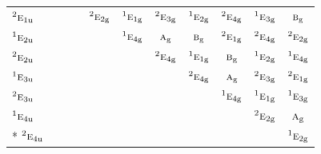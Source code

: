 \documentclass[10pt,a4paper]{article}
\numberwithin{equation}{section}
\newcommand{\irr}[1]{\text{\normalfont\scshape #1}}
\newcommand{\conjpair}[1]{{}^{#1}}
\newcommand{\ptag}[1]{\mathrm{#1}}
\begin{document}
{\begin{longtable}{@{}lcccccccccc@{}}
$\conjpair{2}\irr{e}_{1\ptag{u}}$ &  &  &  & $\conjpair{2}\irr{e}_{2\ptag{g}}$ & $\conjpair{1}\irr{e}_{1\ptag{g}}$ & $\conjpair{2}\irr{e}_{3\ptag{g}}$ & $\conjpair{1}\irr{e}_{2\ptag{g}}$ & $\conjpair{2}\irr{e}_{4\ptag{g}}$ & $\conjpair{1}\irr{e}_{3\ptag{g}}$ & $\irr{b}_{\ptag{g}}$\\
$\conjpair{1}\irr{e}_{2\ptag{u}}$ &  &  &  &  & $\conjpair{1}\irr{e}_{4\ptag{g}}$ & $\irr{a}_{\ptag{g}}$ & $\irr{b}_{\ptag{g}}$ & $\conjpair{2}\irr{e}_{1\ptag{g}}$ & $\conjpair{2}\irr{e}_{4\ptag{g}}$ & $\conjpair{2}\irr{e}_{2\ptag{g}}$\\
$\conjpair{2}\irr{e}_{2\ptag{u}}$ &  &  &  &  &  & $\conjpair{2}\irr{e}_{4\ptag{g}}$ & $\conjpair{1}\irr{e}_{1\ptag{g}}$ & $\irr{b}_{\ptag{g}}$ & $\conjpair{1}\irr{e}_{2\ptag{g}}$ & $\conjpair{1}\irr{e}_{4\ptag{g}}$\\
$\conjpair{1}\irr{e}_{3\ptag{u}}$ &  &  &  &  &  &  & $\conjpair{2}\irr{e}_{4\ptag{g}}$ & $\irr{a}_{\ptag{g}}$ & $\conjpair{2}\irr{e}_{3\ptag{g}}$ & $\conjpair{2}\irr{e}_{1\ptag{g}}$\\
$\conjpair{2}\irr{e}_{3\ptag{u}}$ &  &  &  &  &  &  &  & $\conjpair{1}\irr{e}_{4\ptag{g}}$ & $\conjpair{1}\irr{e}_{1\ptag{g}}$ & $\conjpair{1}\irr{e}_{3\ptag{g}}$\\
$\conjpair{1}\irr{e}_{4\ptag{u}}$ &  &  &  &  &  &  &  &  & $\conjpair{2}\irr{e}_{2\ptag{g}}$ & $\irr{a}_{\ptag{g}}$\\*
$\conjpair{2}\irr{e}_{4\ptag{u}}$ &  &  &  &  &  &  &  &  &  & $\conjpair{1}\irr{e}_{2\ptag{g}}$\\
\bottomrule\end{longtable}}
\end{document}
